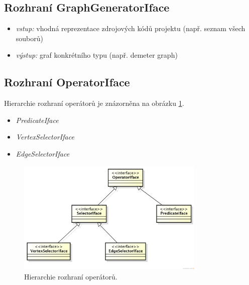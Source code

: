 \subsection{Rozhraní GraphGeneratorIface}
\begin{itemize}
\item \emph{vstup:} vhodná reprezentace zdrojových kódů projektu (např. seznam všech souborů)
\item \emph{výstup:} graf konkrétního typu (např. demeter graph)
\end{itemize}

\subsection{Rozhraní OperatorIface}
Hierarchie rozhraní operátorů je znázorněna na obrázku \ref{design-operator_interfaces_hierarchy}.

\begin{itemize}
\item \emph{PredicateIface}
\item \emph{VertexSelectorIface}
\item \emph{EdgeSelectorIface}
\end{itemize}

\begin{figure}[h!]
  \centering
  \includegraphics[width=0.8\textwidth]{./uml/operator_interfaces.png}
  \caption{Hierarchie rozhraní operátorů.\label{design-operator_interfaces_hierarchy}}
\end{figure}

